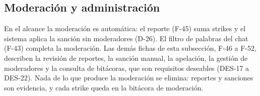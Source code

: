\subsection*{Moderación y administración}

En el alcance la moderación es automática: el reporte (\mbox{F-45}) suma strikes y el sistema aplica la sanción sin moderadores (\mbox{D-26}). El filtro de palabras del chat (\mbox{F-43}) completa la moderación. Las demás fichas de esta subsección, \mbox{F-46} a \mbox{F-52}, describen la revisión de reportes, la sanción manual, la apelación, la gestión de moderadores y la consulta de bitácoras, que son requisitos deseables (\mbox{DES-17} a \mbox{DES-22}). Nada de lo que produce la moderación se elimina: reportes y sanciones son evidencia, y cada strike queda en la bitácora de moderación.

